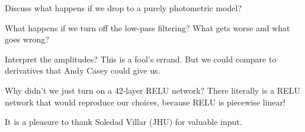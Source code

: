 \documentclass[modern]{aastex631}
\begin{document}
Discuss what happens if we drop to a purely photometric model?

What happens if we turn off the low-pass filtering? What gets worse and what goes wrong?

Interpret the amplitudes? This is a fool's errand. But we could compare to derivatives that Andy Casey could give us.

Why didn't we just turn on a 42-layer RELU network? There literally is a RELU network that would reproduce our choices, because RELU is piecewise linear!

\begin{acknowledgements}
It is a pleasure to thank Soledad Villar (JHU) for valuable input.
\end{acknowledgements}



\end{document}

